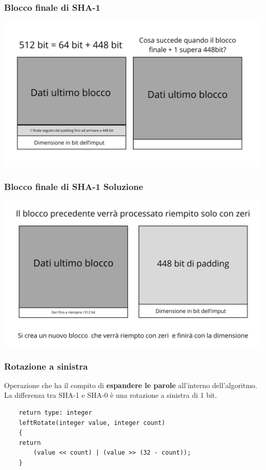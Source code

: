 \begin{frame}
	\frametitle{Blocco finale di SHA-1}
	\begin{center}
		\includegraphics[width=1\textwidth]{img/3-img/blocco-finale1.png}
	\end{center}

\end{frame}

\begin{frame}
	\frametitle{Blocco finale di SHA-1 Soluzione}
	\begin{center}
		\includegraphics[width=1\textwidth]{img/3-img/blocco-finale2.png}
	\end{center}

\end{frame}



\begin{frame}[fragile]
	\frametitle{Rotazione a sinistra}
	Operazione che ha il compito di \textbf{espandere le parole} all'interno dell'algoritmo.
	La differenza tra SHA-1 e SHA-0 è una rotazione a sinistra di 1 bit.

	\vspace{1cm}

	\begin{verbatim}
    return type: integer
	leftRotate(integer value, integer count) 
	{
    return 
		(value << count) | (value >> (32 - count));
	}	
    \end{verbatim}

\end{frame}